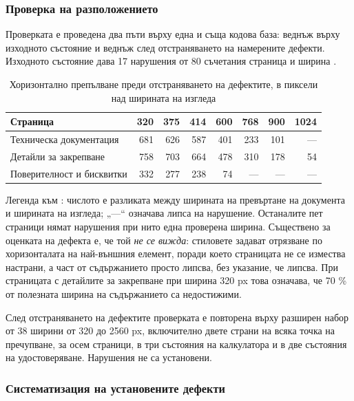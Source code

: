 \subsubsection{Проверка на разположението}
\label{subsec:viewportres}

Проверката е проведена два пъти върху една и съща кодова база: веднъж върху изходното
състояние и веднъж след отстраняването на намерените дефекти. Изходното състояние дава
17 нарушения от 80 съчетания страница и ширина .

\begin{table}[htbp]
\centering
\caption{Хоризонтално препълване преди отстраняването на дефектите, в пиксели над ширината на изгледа}
\label{tab:before}
{\fontsize{10}{12}\selectfont
\begin{tabular}{@{}L{3.9cm}rrrrrrr@{}}
\toprule
\textbf{Страница} & \textbf{320} & \textbf{375} & \textbf{414} & \textbf{600} & \textbf{768} & \textbf{900} & \textbf{1024} \\
\midrule
Техническа документация & 681 & 626 & 587 & 401 & 233 & 101 & --- \\
Детайли за закрепване & 758 & 703 & 664 & 478 & 310 & 178 & 54 \\
Поверителност и бисквитки & 332 & 277 & 238 & 74 & --- & --- & --- \\
\bottomrule
\end{tabular}}
\end{table}

Легенда към : числото е разликата между ширината на превъртане на
документа и ширината на изгледа; „---“ означава липса на нарушение. Останалите пет
страници нямат нарушения при нито една проверена ширина. Съществено за оценката на
дефекта е, че той \emph{не се вижда}: стиловете задават отрязване по хоризонталата на
най-външния елемент, поради което страницата не се измества настрани, а част от
съдържанието просто липсва, без указание, че липсва. При страницата с детайлите за
закрепване при ширина 320 px това означава, че 70 \% от полезната ширина на съдържанието
са недостижими.

След отстраняването на дефектите проверката е повторена върху разширен набор от 38
ширини от 320 до 2560 px, включително двете страни на всяка точка на пречупване, за осем
страници, в три състояния на калкулатора и в две състояния на удостоверяване. Нарушения
не са установени.

\subsubsection{Систематизация на установените дефекти}
\label{subsec:taxonomy}

